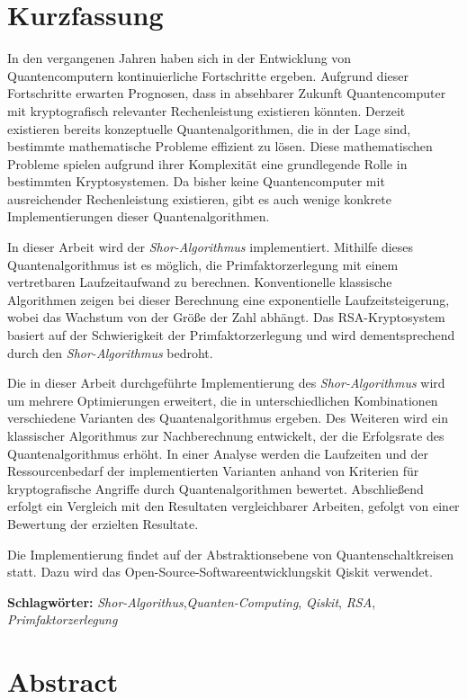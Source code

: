 
\section*{Kurzfassung}
In den vergangenen Jahren haben sich in der Entwicklung von Quantencomputern kontinuierliche Fortschritte ergeben. 
Aufgrund dieser Fortschritte erwarten Prognosen, 
dass in absehbarer Zukunft Quantencomputer mit kryptografisch relevanter Rechenleistung existieren könnten. 
Derzeit existieren bereits konzeptuelle Quantenalgorithmen, die in der Lage sind, 
bestimmte mathematische Probleme effizient zu lösen. 
Diese mathematischen Probleme spielen aufgrund ihrer Komplexität eine grundlegende Rolle in bestimmten Kryptosystemen. 
Da bisher keine Quantencomputer mit ausreichender Rechenleistung existieren, 
gibt es auch wenige konkrete Implementierungen dieser Quantenalgorithmen.

In dieser Arbeit wird der \textit{Shor-Algorithmus} implementiert. 
Mithilfe dieses Quantenalgorithmus ist es möglich, 
die Primfaktorzerlegung mit einem vertretbaren Laufzeitaufwand zu berechnen. 
Konventionelle klassische Algorithmen zeigen bei dieser Berechnung eine exponentielle Laufzeitsteigerung, 
wobei das Wachstum von der Größe der Zahl abhängt. 
Das RSA-Kryptosystem basiert auf der Schwierigkeit der Primfaktorzerlegung und 
wird dementsprechend durch den \textit{Shor-Algorithmus} bedroht. 

Die in dieser Arbeit durchgeführte Implementierung des \textit{Shor-Algorithmus} 
wird um mehrere Optimierungen erweitert, 
die in unterschiedlichen Kombinationen verschiedene Varianten des Quantenalgorithmus ergeben.  
Des Weiteren wird ein klassischer Algorithmus zur Nachberechnung entwickelt, 
der die Erfolgsrate des Quantenalgorithmus erhöht. 
In einer Analyse werden die Laufzeiten und 
der Ressourcenbedarf der implementierten Varianten anhand von Kriterien für kryptografische Angriffe durch Quantenalgorithmen bewertet. 
Abschließend erfolgt ein Vergleich mit den Resultaten vergleichbarer Arbeiten, 
gefolgt von einer Bewertung der erzielten Resultate.

Die Implementierung findet auf der Abstraktionsebene von Quantenschaltkreisen statt. 
Dazu wird das Open-Source-Softwareentwicklungskit Qiskit verwendet.


\textbf{Schlagwörter:} \textit{Shor-Algorithus},\textit{Quanten-Computing}, \textit{Qiskit}, \textit{RSA}, \textit{Primfaktorzerlegung}

\section*{Abstract}

